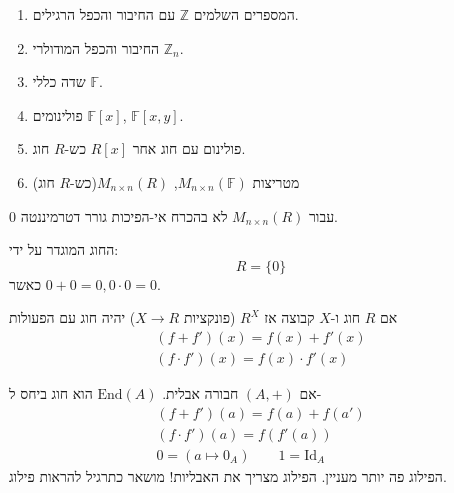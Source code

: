\documentclass{tstextbook}
\begin{document}
\begin{example}
  \begin{enumerate}
    \item המספרים השלמים \(\mathbb{Z}\) עם החיבור והכפל הרגילים. 


    \item החיבור והכפל המודולרי \(\mathbb{Z} _n\). 


    \item שדה כללי \(\mathbb{F}\). 


    \item פולינומים \(\mathbb{F}[x]\), \(\mathbb{F}[x,y]\). 


    \item פולינום עם חוג אחר \(R[x]\) כש-\(R\) חוג. 


    \item מטריצות \(M_{n\times n}\left( \mathbb{F} \right)\), \(M_{n\times n}(R)\)(כש-\(R\) חוג) 


  \end{enumerate}
\end{example}
\begin{remark}
עבור \(M_{n\times n}(R)\) לא בהכרח אי-הפיכות גורר דטרמיננטה 0.

\end{remark}
\begin{definition}
החוג המוגדר על ידי:
$$R=\{ 0 \}$$
כאשר \(0+0=0, 0\cdot 0 =0\).

\end{definition}
\begin{definition}
אם \(R\) חוג ו-\(X\) קבוצה אז \(R^X\) (פונקציות \(X\to R\)) יהיה חוג עם הפעולות
$$\begin{gathered}(f+f')(x)=f(x)+f'(x) \\\left( f\cdot f' \right)(x)=f(x)\cdot f'(x)
\end{gathered}$$

\end{definition}
אם \((A,+)\) חבורה אבלית. \(\mathrm{End}(A)\) הוא חוג ביחס ל- 
$$\begin{gathered}(f+f')(a)=f(a)+f(a') \\\left( f\cdot f' \right)(a)= f(f'(a)) \\0=\left( a\mapsto 0_{A} \right)\qquad 1=\mathrm{Id}_{A}
\end{gathered}$$
הפילוג פה יותר מעניין. הפילוג מצריך את האבליות! מושאר כתרגיל להראות פילוג.
\end{document}
